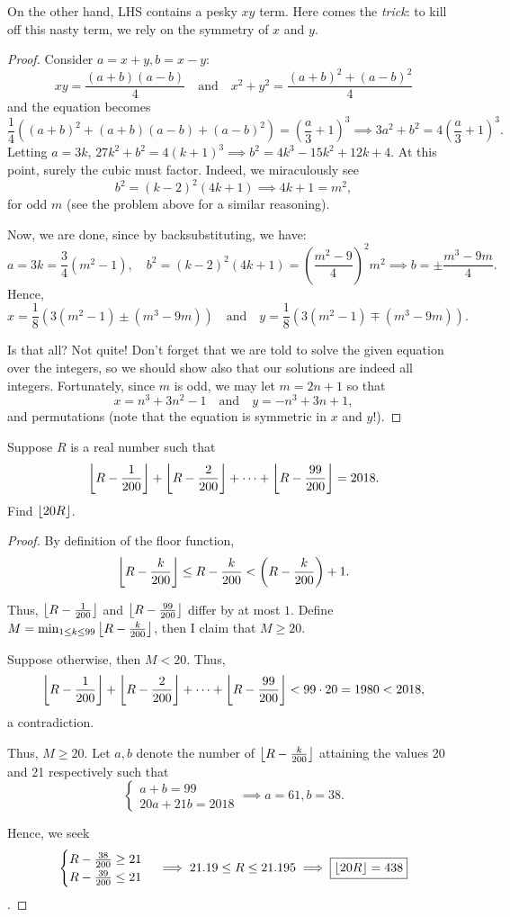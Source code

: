 \documentclass[../main.tex]{subfiles}
\begin{document}
On the other hand, LHS contains a pesky $xy$ term. Here comes the \textit{trick}: to kill off this nasty term, we rely on the symmetry of $x$ and $y$. 
\begin{proof}
    Consider $a=x+y, b=x-y$:
    $$xy= \frac{(a+b)(a-b)}{4} \quad\text{and}\quad x^2+y^2= \frac{(a+b)^2+(a-b)^2}{4}$$
and the equation becomes
$$\frac{1}{4}\left((a+b)^2+(a+b)(a-b)+(a-b)^2\right)=\left(\frac{a}{3}+1\right)^3 \implies 3a^2+b^2=4\left(\frac{a}{3}+1\right)^3.$$
Letting $a=3k$, $27k^2+b^2=4(k+1)^3 \implies b^2=4k^3-15k^2+12k+4$.
At this point, surely the cubic must factor. Indeed, we miraculously see
$$b^2=(k-2)^2(4k+1) \implies 4k+1=m^2,$$
for odd $m$ (see the problem above for a similar reasoning).

Now, we are done, since by backsubstituting, we have:
$$a=3k=\frac{3}{4}(m^2-1), \quad b^2=(k-2)^2(4k+1)=\left(\frac{m^2-9}{4}\right)^2m^2 \implies b=\pm \frac{m^3-9m}{4}.$$
Hence,
$$x=\frac{1}{8}\left(3(m^2-1)\pm(m^3-9m)\right)\quad\text{and}\quad y=\frac{1}{8}\left(3(m^2-1)\mp(m^3-9m)\right).$$

Is that all? Not quite! Don't forget that we are told to solve the given equation over the integers, so we should show also that our solutions are indeed all integers. Fortunately, since $m$ is odd, we may let $m=2n+1$ so that
$$\boxed{x=n^3+3n^2-1\quad\text{and}\quad y=-n^3+3n+1},$$
and permutations (note that the equation is symmetric in $x$ and $y$!).
\end{proof}
\begin{example}[2018 SMO(S) P25]
    Suppose $R$ is a real number such that
    $$\left\lfloor R-\frac{1}{200} \right\rfloor+\left\lfloor R-\frac{2}{200} \right\rfloor+\cdots+\left\lfloor R-\frac{99}{200} \right\rfloor=2018.$$
    Find $\left\lfloor 20R \right\rfloor$.
\end{example}
\begin{proof}
    By definition of the floor function,
    $$\left\lfloor R-\frac{k}{200} \right\rfloor\leq R-\frac{k}{200} < \left(R-\frac{k}{200}\right)+1.$$
    
    Thus, $\left\lfloor R-\frac{1}{200} \right\rfloor$ and $\left\lfloor R-\frac{99}{200} \right\rfloor$ differ by at most $1$. Define $M=\min_{1\leq k\leq 99}\left\lfloor R-\frac{k}{200} \right\rfloor$, then I claim that $M\geq 20$.

    Suppose otherwise, then $M < 20$. Thus, 
    $$\left\lfloor R-\frac{1}{200} \right\rfloor+\left\lfloor R-\frac{2}{200} \right\rfloor+\cdots+\left\lfloor R-\frac{99}{200} \right\rfloor < 99\cdot 20 = 1980 < 2018,$$
    a contradiction.

    Thus, $M \geq 20$. Let $a, b$ denote the number of $\left\lfloor R-\frac{k}{200} \right\rfloor$ attaining the values 20 and 21 respectively such that
    $$\begin{cases}
        a+b=99 \\
        20a+21b=2018
    \end{cases}
    \implies a=61, b=38.$$

    Hence, we seek 
    $$\begin{cases}
        R-\frac{38}{200} \geq 21 \\
        R-\frac{39}{200}\leq 21
    \end{cases}
    \implies 21.19 \leq R \leq 21.195 \implies \boxed{\left\lfloor 20R \right\rfloor=438}$$.
\end{proof}
\end{document}

